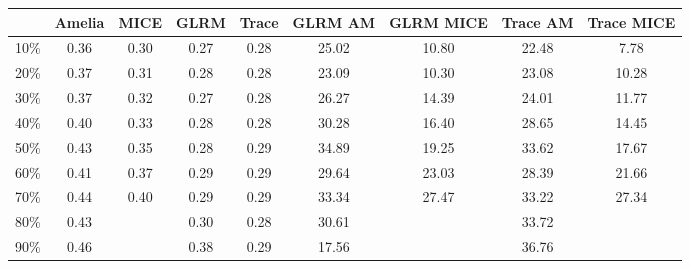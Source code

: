 \begin{table}[ht]
\centering
\begin{tabular}{|c|c|c|c|c|c|c|c|c|}
  \hline
 & Amelia & MICE & GLRM & Trace & GLRM AM & GLRM MICE & Trace AM & Trace MICE \\ 
  \hline
10\% & 0.36 & 0.30 & 0.27 & 0.28 & 25.02 & 10.80 & 22.48 & 7.78 \\ 
  20\% & 0.37 & 0.31 & 0.28 & 0.28 & 23.09 & 10.30 & 23.08 & 10.28 \\ 
  30\% & 0.37 & 0.32 & 0.27 & 0.28 & 26.27 & 14.39 & 24.01 & 11.77 \\ 
  40\% & 0.40 & 0.33 & 0.28 & 0.28 & 30.28 & 16.40 & 28.65 & 14.45 \\ 
  50\% & 0.43 & 0.35 & 0.28 & 0.29 & 34.89 & 19.25 & 33.62 & 17.67 \\ 
  60\% & 0.41 & 0.37 & 0.29 & 0.29 & 29.64 & 23.03 & 28.39 & 21.66 \\ 
  70\% & 0.44 & 0.40 & 0.29 & 0.29 & 33.34 & 27.47 & 33.22 & 27.34 \\ 
  80\% & 0.43 &  & 0.30 & 0.28 & 30.61 &  & 33.72 &  \\ 
  90\% & 0.46 &  & 0.38 & 0.29 & 17.56 &  & 36.76 &  \\ 
   \hline
\end{tabular}
\end{table}
